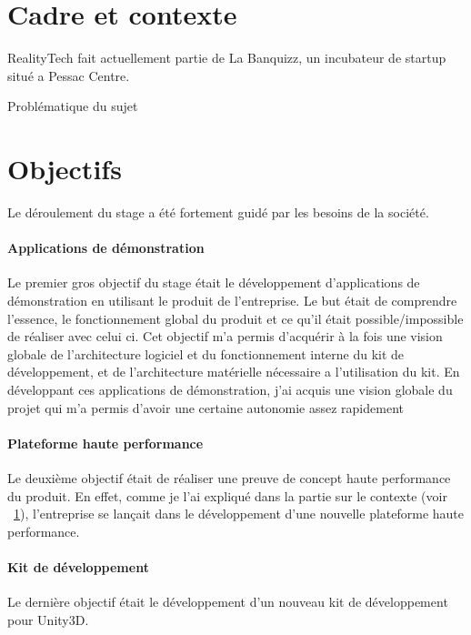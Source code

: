 \section{Cadre et contexte}
\label{sec:contexte}
RealityTech fait actuellement partie de La Banquizz, un incubateur de startup situé a Pessac Centre.

\begin{center}
Problématique du sujet
\end{center}


\section{Objectifs}
Le déroulement du stage a été fortement guidé par les besoins de la société.
\paragraph{Applications de démonstration}Le premier gros objectif du stage était le développement d'applications de démonstration en utilisant le produit de l'entreprise. Le but était de comprendre l'essence, le fonctionnement global du produit et ce qu'il était possible/impossible de réaliser avec celui ci. Cet objectif m'a permis d'acquérir à la fois une vision globale de l'architecture logiciel et du fonctionnement interne du kit de développement, et de l'architecture matérielle nécessaire a l'utilisation du kit. En développant ces applications de démonstration, j'ai acquis une vision globale du projet qui m'a permis d'avoir une certaine autonomie assez rapidement

\paragraph{Plateforme haute performance} Le deuxième objectif était de réaliser une preuve de concept haute performance du produit. En effet, comme je l'ai expliqué dans la partie sur le contexte (voir ~\ref{sec:contexte}), l'entreprise se lançait dans le développement d'une nouvelle plateforme haute performance.

\paragraph{Kit de développement} Le dernière objectif était le développement d'un nouveau kit de développement pour Unity3D.  %